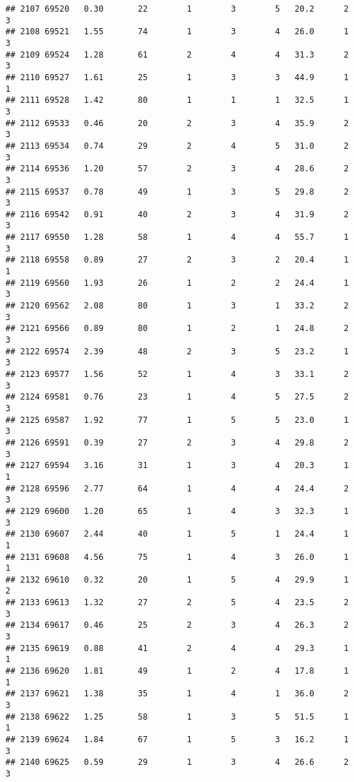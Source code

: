 \documentclass[
]{article}
\begin{document}
\begin{verbatim}
## 2107 69520   0.30       22        1        3        5   20.2      2      3
## 2108 69521   1.55       74        1        3        4   26.0      1      3
## 2109 69524   1.28       61        2        4        4   31.3      2      3
## 2110 69527   1.61       25        1        3        3   44.9      1      1
## 2111 69528   1.42       80        1        1        1   32.5      1      3
## 2112 69533   0.46       20        2        3        4   35.9      2      3
## 2113 69534   0.74       29        2        4        5   31.0      2      3
## 2114 69536   1.20       57        2        3        4   28.6      2      3
## 2115 69537   0.78       49        1        3        5   29.8      2      3
## 2116 69542   0.91       40        2        3        4   31.9      2      3
## 2117 69550   1.28       58        1        4        4   55.7      1      3
## 2118 69558   0.89       27        2        3        2   20.4      1      1
## 2119 69560   1.93       26        1        2        2   24.4      1      3
## 2120 69562   2.08       80        1        3        1   33.2      2      3
## 2121 69566   0.89       80        1        2        1   24.8      2      3
## 2122 69574   2.39       48        2        3        5   23.2      1      3
## 2123 69577   1.56       52        1        4        3   33.1      2      3
## 2124 69581   0.76       23        1        4        5   27.5      2      3
## 2125 69587   1.92       77        1        5        5   23.0      1      3
## 2126 69591   0.39       27        2        3        4   29.8      2      3
## 2127 69594   3.16       31        1        3        4   20.3      1      1
## 2128 69596   2.77       64        1        4        4   24.4      2      3
## 2129 69600   1.20       65        1        4        3   32.3      1      3
## 2130 69607   2.44       40        1        5        1   24.4      1      1
## 2131 69608   4.56       75        1        4        3   26.0      1      1
## 2132 69610   0.32       20        1        5        4   29.9      1      2
## 2133 69613   1.32       27        2        5        4   23.5      2      3
## 2134 69617   0.46       25        2        3        4   26.3      2      3
## 2135 69619   0.88       41        2        4        4   29.3      1      1
## 2136 69620   1.81       49        1        2        4   17.8      1      1
## 2137 69621   1.38       35        1        4        1   36.0      2      3
## 2138 69622   1.25       58        1        3        5   51.5      1      1
## 2139 69624   1.84       67        1        5        3   16.2      1      3
## 2140 69625   0.59       29        1        3        4   26.6      2      3

\end{verbatim}
\end{document}
